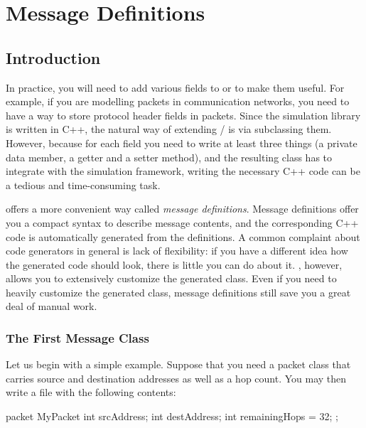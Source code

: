 \chapter{Message Definitions}
\label{cha:message-definitions}

\section{Introduction}
\label{sec:ch-msg-defs:intro}

In practice, you will need to add various fields to  or
 to make them useful. For example, if you are modelling
packets in communication networks, you need to have a way to store protocol
header fields in packets. Since the simulation library is written in C++,
the natural way of extending / is via
subclassing them. However, because for each field you need to write at
least three things (a private data member, a getter and a setter method),
and the resulting class has to integrate with the simulation framework,
writing the necessary C++ code can be a tedious and time-consuming task.

{\opp} offers a more convenient way called \textit{message definitions}.
Message definitions offer you a compact syntax to describe message
contents, and the corresponding C++ code is automatically generated from
the definitions. A common complaint about code generators in general is
lack of flexibility: if you have a different idea how the generated code
should look, there is little you can do about it. {\opp}, however, allows
you to extensively customize the generated class. Even if you need to
heavily customize the generated class, message definitions still save you a
great deal of manual work.


\subsection{The First Message Class}
\label{sec:ch-msg-defs:first-msg-class}

Let us begin with a simple example. Suppose that you need a packet class that
carries source and destination addresses as well as a hop count. You may then
write a  file with the following contents:

\begin{msg}
packet MyPacket
{
     int srcAddress;
     int destAddress;
     int remainingHops = 32;
};
\end{msg}

